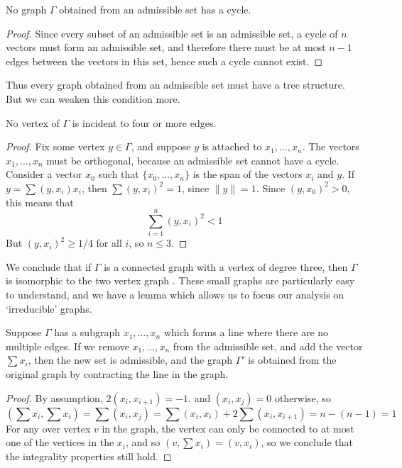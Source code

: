 \begin{corollary}
    No graph $\Gamma$ obtained from an admissible set has a cycle.
\end{corollary}
\begin{proof}
    Since every subset of an admissible set is an admissible set, a cycle of $n$ vectors must form an admissible set, and therefore there must be at most $n-1$ edges between the vectors in this set, hence such a cycle cannot exist.
\end{proof}

Thus every graph obtained from an admissible set must have a tree structure. But we can weaken this condition more.

\begin{lemma}
    No vertex of $\Gamma$ is incident to four or more edges.
\end{lemma}
\begin{proof}
    Fix some vertex $y \in \Gamma$, and suppose $y$ is attached to $x_1, \dots, x_n$. The vectors $x_1, \dots, x_n$ must be orthogonal, because an admissible set cannot have a cycle. Consider a vector $x_0$ such that $\{ x_0, \dots, x_n \}$ is the span of the vectors $x_i$ and $y$. If $y = \sum (y, x_i) x_i$, then $\sum (y, x_i)^2 = 1$, since $\| y \| = 1$. Since $(y, x_0)^2 > 0$, this means that
    \[ \sum_{i = 1}^n (y,x_i)^2 < 1 \]
    But $(y,x_i)^2 \geq 1/4$ for all $i$, so $n \leq 3$.
\end{proof}

We conclude that if $\Gamma$ is a connected graph with a vertex of degree three, then $\Gamma$ is isomorphic to the two vertex graph %
%
. These small graphs are particularly easy to understand, and we have a lemma which allows us to focus our analysis on `irreducible' graphs.

\begin{lemma}
    Suppose $\Gamma$ has a subgraph $x_1, \dots, x_n$ which forms a line
    where there are no multiple edges. If we remove $x_1, \dots, x_n$ from the admissible set, and add the vector $\sum x_i$, then the new set is admissible, and the graph $\Gamma'$ is obtained from the original graph by contracting the line in the graph.
\end{lemma}
\begin{proof}
    By assumption, $2(x_i, x_{i+1}) = -1$. and $(x_i, x_j) = 0$ otherwise, so
    \[ \left( \sum x_i, \sum x_i \right) = \sum (x_i, x_j) = \sum (x_i, x_i) + 2 \sum (x_i, x_{i+1}) = n-(n-1) = 1 \]
    For any over vertex $v$ in the graph, the vertex can only be connected to at most one of the vertices in the $x_i$, and so $(v, \sum x_i) = (v,x_i)$, so we conclude that the integrality properties still hold.
\end{proof}

